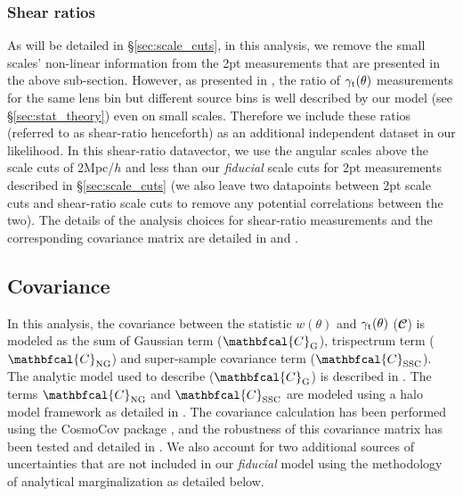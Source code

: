 \documentclass[aps, prd,twocolumn,superscriptaddress,nofootinbib,preprintnumbers]{revtex4-1}
\newcommand{\gammat}{\ensuremath{\gamma_{\rm t}(\theta)}}
\newcommand{\wtheta}{\ensuremath{w(\theta)}}
\newcommand{\SP}[1]{{\color{red}[SP: #1]}}
\begin{document}
\subsubsection{Shear ratios}\label{sec:shear_ratio}
As will be detailed in \S\ref{sec:scale_cuts}, in this analysis, we remove the small scales' non-linear information from the 2pt measurements that are presented in the above sub-section. However, as presented in \citet*{y3-shearratio}, the ratio of $\gammat$ measurements for the same lens bin but different source bins is well described by our model (see \S\ref{sec:stat_theory}) even on small scales. Therefore we include these ratios (referred to as shear-ratio henceforth) as an additional independent dataset in our likelihood. In this shear-ratio datavector, we use the angular scales above the scale cuts of 2Mpc/$h$ and less than our \textit{fiducial} scale cuts for 2pt measurements described in \S\ref{sec:scale_cuts} (we also leave two datapoints between 2pt scale cuts and shear-ratio scale cuts to remove any potential correlations between the two). The details of the analysis choices for shear-ratio measurements and the corresponding covariance matrix are detailed in \citet*{y3-shearratio} and \citet*{y3-3x2ptkp}. 





\subsection{Covariance}
\label{sec:cov}

In this analysis, the covariance between the statistic $\wtheta$ and $\gammat$ (${\mathbfcal{C}}$) is modeled as the sum of Gaussian term ($\mathbfcal{C}_{\rm G}$), trispectrum term ($\mathbfcal{C}_{\rm NG}$) and super-sample covariance term ($\mathbfcal{C}_{\rm SSC}$). The analytic model used to describe ($\mathbfcal{C}_{\rm G}$) is described in \cite{y3-covariances}. The terms $\mathbfcal{C}_{\rm NG}$ and $\mathbfcal{C}_{\rm SSC}$ are modeled using a halo model framework as detailed in \cite{Krause:2016jvl, Krause2017}. The covariance calculation has been performed using the CosmoCov package \citep{Fang:2020vhc}, and the robustness of this covariance matrix has been tested and detailed in \cite{y3-covariances}. We also account for two additional sources of uncertainties that are not included in our \textit{fiducial} model using the methodology of analytical marginalization \citep{Bridle_2002} as detailed below. 
\end{document}

